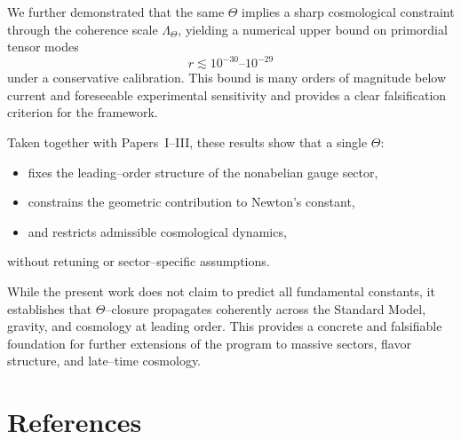 \documentclass[11pt]{article}
\begin{document}
We further demonstrated that the same $\Theta$ implies a sharp cosmological
constraint through the coherence scale $\Lambda_\Theta$, yielding a numerical
upper bound on primordial tensor modes
\[
r \lesssim 10^{-30}\text{--}10^{-29}
\]
under a conservative calibration.
This bound is many orders of magnitude below current and foreseeable experimental
sensitivity and provides a clear falsification criterion for the framework.

Taken together with Papers~I--III, these results show that a single $\Theta$:
\begin{itemize}
\item fixes the leading--order structure of the nonabelian gauge sector,
\item constrains the geometric contribution to Newton's constant,
\item and restricts admissible cosmological dynamics,
\end{itemize}
without retuning or sector--specific assumptions.

While the present work does not claim to predict all fundamental constants,
it establishes that $\Theta$--closure propagates coherently across the Standard
Model, gravity, and cosmology at leading order.
This provides a concrete and falsifiable foundation for further extensions of
the program to massive sectors, flavor structure, and late--time cosmology.


\section*{References}
\end{document}
